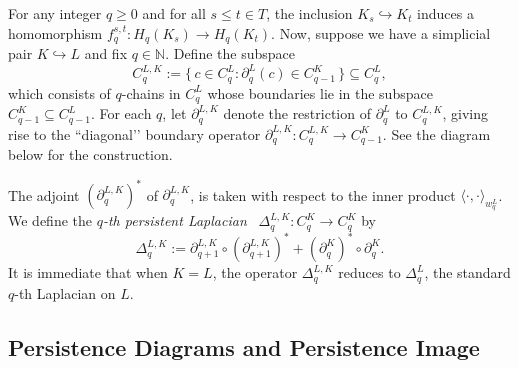 \documentclass{article}
\begin{document}
For any integer $q \ge 0$ and for all $s \le t \in T$, the inclusion $K_s \hookrightarrow K_t$ induces a homomorphism \(f_q^{s,t} : H_q(K_s) \to H_q(K_t)\). Now, suppose we have a simplicial pair $K \hookrightarrow L$ and fix $q \in \mathbb{N}$. Define the subspace
\[
C_q^{L,K} := \{\, c \in C_q^L : \partial_q^L(c) \in C_{q-1}^K \,\} \subseteq C_q^L,
\]
which consists of $q$-chains in $C_q^L$ whose boundaries lie in the subspace $C_{q-1}^K \subseteq C_{q-1}^L$.  
For each $q$, let $\partial_q^{L,K}$ denote the restriction of $\partial_q^L$ to $C_q^{L,K}$, giving rise to the ``diagonal’’ boundary operator \(\partial_q^{L,K} : C_q^{L,K} \to C_{q-1}^K\). See the diagram below for the construction.

\begin{center}
    
\end{center}

The adjoint $\left(\partial_q^{L,K}\right)^*$ of $\partial_q^{L,K}$, is taken with respect to the inner product $\langle \cdot, \cdot \rangle_{w_q^L}$. We define the \emph{$q$-th persistent Laplacian}~\cite{WNW20} $\Delta_q^{L,K} : C_q^K \to C_q^K$ by
\[
\Delta_q^{L,K} := \partial_{q+1}^{L,K} \circ \left(\partial_{q+1}^{L,K}\right)^* 
+ \left(\partial_q^K\right)^* \circ \partial_q^K.
\]
It is immediate that when $K = L$, the operator $\Delta_q^{L,K}$ reduces to $\Delta_q^L$, the standard $q$-th Laplacian on $L$.

\subsection{Persistence Diagrams and Persistence Image}
\end{document}
